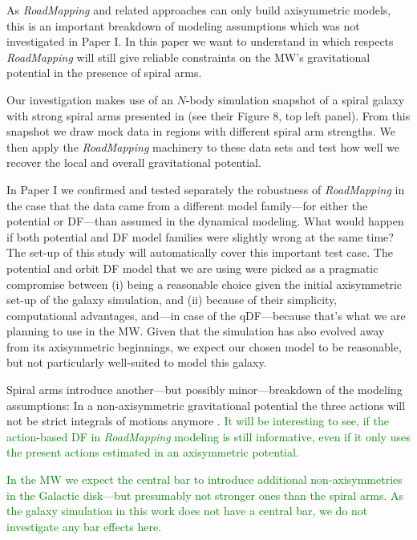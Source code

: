 \documentclass[iop,revtex4,numberedappendix,appendixfloats]{emulateapj}
\newcommand{\RM}{{\sl RoadMapping}}
\newcommand{\NEW}[1]{\textcolor{Green}{#1}}
\begin{document}
As \RM{} and related approaches can only build axisymmetric models, this is an important breakdown of modeling assumptions which was not investigated in Paper I. In this paper we want to understand in which respects \RM{} will still give reliable constraints on the MW's gravitational potential in the presence of spiral arms.

Our investigation makes use of an $N$-body simulation snapshot of a spiral galaxy with strong spiral arms presented in \citet{2013ApJ...766...34D} (see their Figure 8, top left panel). From this snapshot we draw mock data in regions with different spiral arm strengths. We then apply the \RM{} machinery to these data sets and test how well we recover the local and overall gravitational potential.

In Paper I we confirmed and tested separately the robustness of \RM{} in the case that the data came from a different model family---for either the potential or DF---than assumed in the dynamical modeling. What would happen if both potential and DF model families were slightly wrong at the same time? The set-up of this study will automatically cover this important test case. The potential and orbit DF model that we are using were picked as a pragmatic compromise between (i) being a reasonable choice given the initial axisymmetric set-up of the galaxy simulation, and (ii) because of their simplicity, computational advantages, and---in case of the qDF---because that's what we are planning to use in the MW. Given that the simulation has also evolved away from its axisymmetric beginnings, we expect our chosen model to be reasonable, but not particularly well-suited to model this galaxy.

Spiral arms introduce another---but possibly minor---breakdown of the modeling assumptions: In a non-axisymmetric gravitational potential the three actions will not be strict integrals of motions anymore \citep{2008gady.book.....B,2011A&A...527A.147M,2012A&A...548A.127M,2012MNRAS.422.1363S,2012MNRAS.421.1529G,2016ApJ...824...39V}. \NEW{It will be interesting to see, if the action-based DF in \RM{} modeling is still informative, even if it only uses the present actions estimated in an axisymmetric potential.}

\NEW{In the MW we expect the central bar to introduce additional non-axisymmetries in the Galactic disk---but presumably not stronger ones than the spiral arms. As the galaxy simulation in this work does not have a central bar, we do not investigate any bar effects here.}
\end{document}

